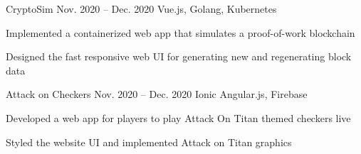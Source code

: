 \begin{cvprojects}
  \cvproject
  {CryptoSim}
  {\href{https://github.com/jzlotek/bc}{\faGithubSquare\acvHeaderIconSep\@KevinIsMyName}}
  {Nov. 2020 -- Dec. 2020}
  {Vue.js, Golang, Kubernetes}
  {
    \begin{cvitems}
      \item Implemented a containerized web app that simulates a proof-of-work blockchain
      \item Designed the fast responsive web UI for generating new and regenerating block data
    \end{cvitems}
  }

  \cvproject
  {Attack on Checkers}
  {\href{https://github.com/lixinwei123/SE181}{\faGithubSquare\acvHeaderIconSep\@KevinIsMyName}}
  {Nov. 2020 -- Dec. 2020}
  {Ionic Angular.js, Firebase}
  {
    \begin{cvitems}
      \item Developed a web app for players to play Attack On Titan themed checkers live
      \item Styled the website UI and implemented Attack on Titan graphics
    \end{cvitems}
  }






\end{cvprojects}
